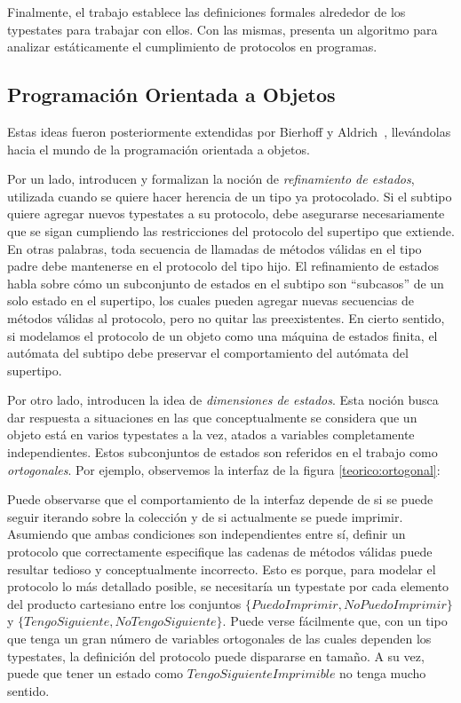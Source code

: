 Finalmente, el trabajo establece las definiciones formales alrededor de los typestates para trabajar con ellos. Con las mismas, presenta un algoritmo para analizar estáticamente el cumplimiento de protocolos en programas.

\subsection{Programación Orientada a Objetos}

Estas ideas fueron posteriormente extendidas por Bierhoff y Aldrich~\cite{Lightweight}, llevándolas hacia el mundo de la programación orientada a objetos.

Por un lado, introducen y formalizan la noción de \textit{refinamiento de estados}, utilizada cuando se quiere hacer herencia de un tipo ya protocolado. Si el subtipo quiere agregar nuevos typestates a su protocolo, debe asegurarse necesariamente que se sigan cumpliendo las restricciones del protocolo del supertipo que extiende. En otras palabras, toda secuencia de llamadas de métodos válidas en el tipo padre debe mantenerse en el protocolo del tipo hijo. El refinamiento de estados habla sobre cómo un subconjunto de estados en el subtipo son ``subcasos'' de un solo estado en el supertipo, los cuales pueden agregar nuevas secuencias de métodos válidas al protocolo, pero no quitar las preexistentes. En cierto sentido, si modelamos el protocolo de un objeto como una máquina de estados finita, el autómata del subtipo debe preservar el comportamiento del autómata del supertipo.

Por otro lado, introducen la idea de \textit{dimensiones de estados}. Esta noción busca dar respuesta a situaciones en las que conceptualmente se considera que un objeto está en varios typestates a la vez, atados a variables completamente independientes. Estos subconjuntos de estados son referidos en el trabajo como \textit{ortogonales}. Por ejemplo, observemos la interfaz de la figura \ref{teorico:ortogonal}:



Puede observarse que el comportamiento de la interfaz depende de si se puede seguir iterando sobre la colección y de si actualmente se puede imprimir. Asumiendo que ambas condiciones son independientes entre sí, definir un protocolo que correctamente especifique las cadenas de métodos válidas puede resultar tedioso y conceptualmente incorrecto. Esto es porque, para modelar el protocolo lo más detallado posible, se necesitaría un typestate por cada elemento del producto cartesiano entre los conjuntos $\{\mathit{PuedoImprimir}, \mathit{NoPuedoImprimir}\}$ y $\{\mathit{TengoSiguiente}, \mathit{NoTengoSiguiente}\}$. Puede verse fácilmente que, con un tipo que tenga un gran número de variables ortogonales de las cuales dependen los typestates, la definición del protocolo puede dispararse en tamaño. A su vez, puede que tener un estado como $\mathit{TengoSiguienteImprimible}$ no tenga mucho sentido.

